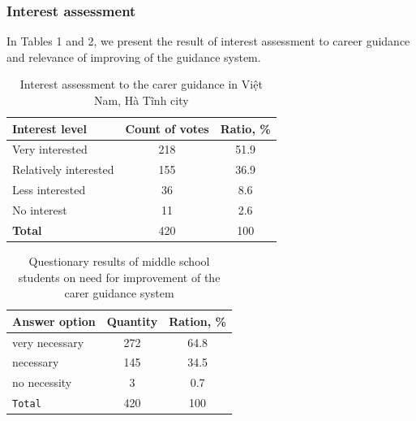 \documentclass[10pt,dvipsnames]{beamer}
\begin{document}
\begin{frame}
  \frametitle{Interest assessment}
  In Tables 1 and 2, we present the result of interest assessment to career guidance and relevance of improving of the guidance system.
\begin{table}[thb]
  \caption{Interest assessment to the carer guidance in Việt Nam, Hà Tĩnh city}
  \label{tab:interest}
  \centering
  \begin{tabular}{|l|c|c|}
    \hline
    \textbf{Interest level} & \textbf{Count of votes} & \textbf{Ratio, \%} \\
    \hline
    Very interested & 218 & 51.9 \\
    \hline
    Relatively interested & 155 & 36.9 \\
    \hline
    Less interested & 36 & 8.6 \\
    \hline
    No interest & 11 & 2.6 \\
    \textbf{Total} & 420 & 100 \\
    \hline
  \end{tabular}
\end{table}

\begin{table}[bht]
  \caption{Questionary results of middle school students on need for improvement of the carer guidance system}
  \label{tab:interest}
  \centering
  \begin{tabular}{|l|c|c|}
    \hline
    \textbf{Answer option} & \textbf{Quantity} & \textbf{Ration, \%} \\
    \hline
    very necessary & 272 & 64.8 \\
    \hline
    necessary & 145 & 34.5 \\
    \hline
    no necessity & 3 & 0.7 \\
    \hline
    \texttt{Total} & 420 & 100 \\
    \hline
  \end{tabular}
\end{table}
\end{frame}
\end{document}
